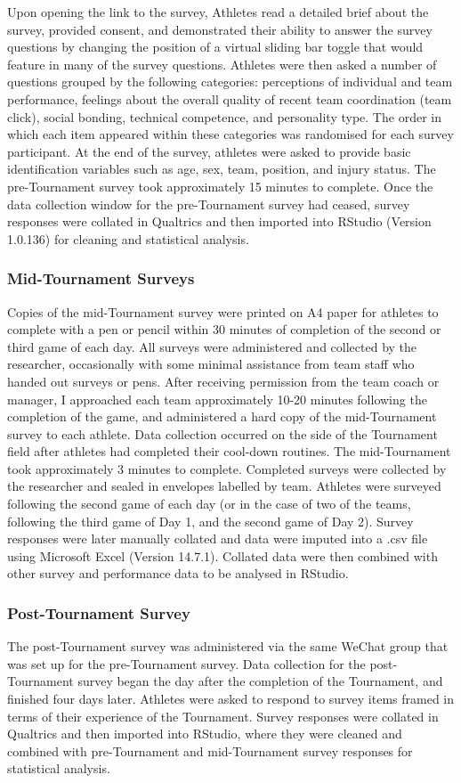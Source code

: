 Upon opening the link to the survey, Athletes read a detailed brief about the survey, provided consent, and demonstrated their ability to answer the survey questions by changing the position of a virtual sliding bar toggle that would feature in many of the survey questions.  Athletes were then asked a number of questions grouped by the following categories: perceptions of individual and team performance, feelings about the overall quality of recent team coordination (team click), social bonding, technical competence, and personality type. The order in which each item appeared within these categories was randomised for each survey participant. At the end of the survey, athletes were asked to provide basic identification variables such as age, sex, team, position, and injury status.  The pre-Tournament survey took approximately 15 minutes to complete.  Once the data collection window for the pre-Tournament survey had ceased, survey responses were collated in Qualtrics and then imported into RStudio (Version 1.0.136) for cleaning and statistical analysis.

\subsubsection{Mid-Tournament Surveys}
Copies of the mid-Tournament survey were printed on A4 paper for athletes to complete with a pen or pencil within 30 minutes of completion of the second or third game of each day. All surveys were administered and collected by the researcher, occasionally with some minimal assistance from team staff who handed out surveys or pens. After receiving permission from the team coach or manager, I approached each team approximately 10-20 minutes following the completion of the game, and administered a hard copy of the mid-Tournament survey to each athlete.  Data collection occurred on the side of the Tournament field after athletes had completed their cool-down routines.  The mid-Tournament took approximately 3 minutes to complete. Completed surveys were collected by the researcher and sealed in envelopes labelled by team. Athletes were surveyed following the second game of each day (or in the case of two of the teams, following the third game of Day 1, and the second game of Day 2).  Survey responses were later manually collated and data were imputed into a .csv file using Microsoft Excel (Version 14.7.1). Collated data were then combined with other survey and performance data to be analysed in RStudio.
\subsubsection{Post-Tournament Survey}
The post-Tournament survey was administered via the same WeChat group that was set up for the pre-Tournament survey. Data collection for the post-Tournament survey began the day after the completion of the Tournament, and finished four days later. Athletes were asked to respond to survey items framed in terms of their experience of the Tournament. Survey responses were collated in Qualtrics and then imported into RStudio, where they were cleaned and combined with pre-Tournament and mid-Tournament survey responses for statistical analysis.
